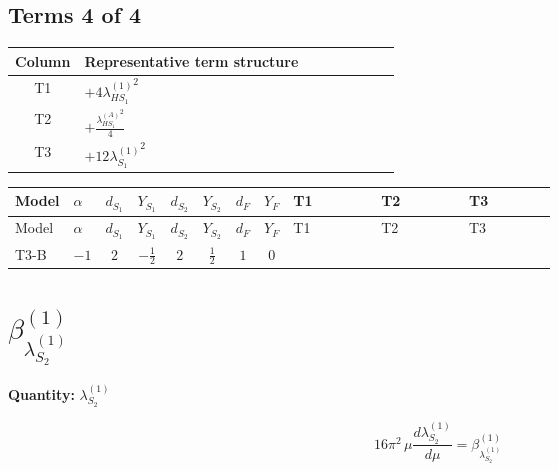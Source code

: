 \documentclass[8pt]{article}
\begin{document}
\begin{landscape}
\subsection*{Terms 4 of 4}
\begin{center}
\begin{tabular}{@{}c >{\raggedright\arraybackslash}p{0.82\linewidth}@{}}
\toprule
Column & Representative term structure \\
\midrule
T1 & \(\displaystyle +4 {\lambda_{HS_1}^{(1)}}^2\) \\
\midrule
T2 & \(\displaystyle +\frac{{\lambda_{HS_1}^{(A)}}^2}{4}\) \\
\midrule
T3 & \(\displaystyle +12 {\lambda_{S_1}^{(1)}}^2\) \\
\midrule
\bottomrule
\end{tabular}
\end{center}
\smallskip
\tiny
\begin{longtable}{@{}llcccccc >{\raggedright\arraybackslash}p{0.21\linewidth} >{\raggedright\arraybackslash}p{0.21\linewidth} >{\raggedright\arraybackslash}p{0.21\linewidth}@{}}
\toprule
Model & $\alpha$ & $d_{S_1}$ & $Y_{S_1}$ & $d_{S_2}$ & $Y_{S_2}$ & $d_F$ & $Y_F$ & T1 & T2 & T3 \\
\midrule
\endfirsthead
\toprule
Model & $\alpha$ & $d_{S_1}$ & $Y_{S_1}$ & $d_{S_2}$ & $Y_{S_2}$ & $d_F$ & $Y_F$ & T1 & T2 & T3 \\
\midrule
\endhead
T3-B & $-1$ & $2$ & $-\frac{1}{2}$ & $2$ & $\frac{1}{2}$ & $1$ & $0$ & \scriptsize\adjustbox{max width=\linewidth}{$\begin{gathered} +4 {\lambda_{HS_1}^{(1)}}^2\end{gathered}$} & \scriptsize\adjustbox{max width=\linewidth}{$\begin{gathered} +\frac{{\lambda_{HS_1}^{(A)}}^2}{4}\end{gathered}$} & \scriptsize\adjustbox{max width=\linewidth}{$\begin{gathered} +12 {\lambda_{S_1}^{(1)}}^2\end{gathered}$} \\
\midrule
\bottomrule
\end{longtable}
\clearpage
\section*{$\beta_{\lambda_{S_2}^{(1)}}^{(1)}$}
\noindent\textbf{Quantity: }$\lambda_{S_2}^{(1)}$\par\smallskip
\[16\pi^2\,\mu\frac{d \lambda_{S_2}^{(1)}}{d\mu}=\beta_{\lambda_{S_2}^{(1)}}^{(1)}\]

\end{landscape}
\end{document}
